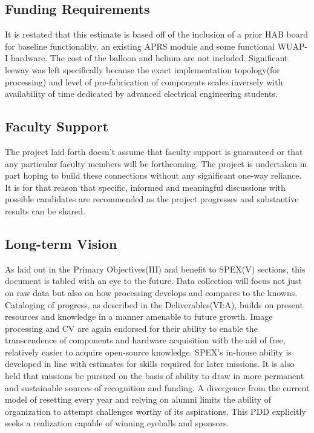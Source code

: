\documentclass[conference]{IEEEtran} %
\begin{document}
\subsection{Funding Requirements}


It is restated that this estimate is based off of the inclusion of a prior HAB board for baseline functionality, an existing APRS module and some functional WUAP-I hardware. The cost of the balloon and helium are not included. Significant leeway was left specifically because the exact implementation topology(for processing) and level of pre-fabrication of components scales inversely with availability of time dedicated by advanced electrical engineering students.
\subsection{Faculty Support}
The project laid forth doesn’t assume that faculty support is guaranteed or that any particular faculty members will be forthcoming. The project is undertaken in part hoping to build these connections without any significant one-way reliance. It is for that reason that specific, informed and meaningful discussions with possible candidates are recommended as the project progresses and substantive results can be shared.

\subsection{Long-term Vision}
As laid out in the Primary Objectives(III) and benefit to SPEX(V) sections, this document is tabled with an eye to the future. Data collection will focus not just on raw data but also on how processing develops and compares to the knowns. Cataloging of progress, as described in the Deliverables(VI:A), builds on present resources and knowledge in a manner amenable to future growth. Image processing and CV are again endorsed for their ability to enable the transcendence of components and hardware acquisition with the aid of free, relatively easier to acquire open-source knowledge. SPEX’s in-house ability is developed in line with estimates for skills required for later missions. It is also held that missions be pursued on the basis of ability to draw in more permanent and sustainable sources of recognition and funding. A divergence from the current model of resetting every year and relying on alumni limits the ability of organization to attempt challenges worthy of its aspirations. This PDD explicitly seeks a realization capable of winning eyeballs and sponsors.
\end{document}
